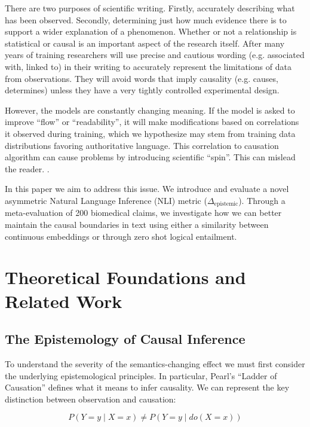 \documentclass[acmsmall]{acmart}
\begin{document}
There are two purposes of scientific writing. Firstly, accurately describing what has been observed. Secondly, determining just how much evidence there is to support a wider explanation of a phenomenon. Whether or not a relationship is statistical or causal is an important aspect of the research itself. After many years of training researchers will use precise and cautious wording (e.g. associated with, linked to) in their writing to accurately represent the limitations of data from observations. They will avoid words that imply causality (e.g. causes, determines) unless they have a very tightly controlled experimental design.

However, the models are constantly changing meaning. If the model is asked to improve ``flow'' or ``readability'', it will make modifications based on correlations it observed during training, which we hypothesize may stem from training data distributions favoring authoritative language. This correlation to causation algorithm can cause problems by introducing scientific ``spin''. This can mislead the reader. \cite{chiu2017spin}.

In this paper we aim to address this issue. We introduce and evaluate a novel asymmetric Natural Language Inference (NLI) metric ($\Delta_{\text{epistemic}}$). Through a meta-evaluation of 200 biomedical claims, we investigate how we can better maintain the causal boundaries in text using either a similarity between continuous embeddings or through zero shot logical entailment.

\section{Theoretical Foundations and Related Work}

\subsection{The Epistemology of Causal Inference}

To understand the severity of the semantics-changing effect we must first consider the underlying epistemological principles. In particular, Pearl's ``Ladder of Causation'' \cite{pearl2018book} defines what it means to infer causality. We can represent the key distinction between observation and causation:

\begin{equation}
P(Y=y \mid X=x) \neq P(Y=y \mid do(X=x))
\end{equation}
\end{document}
